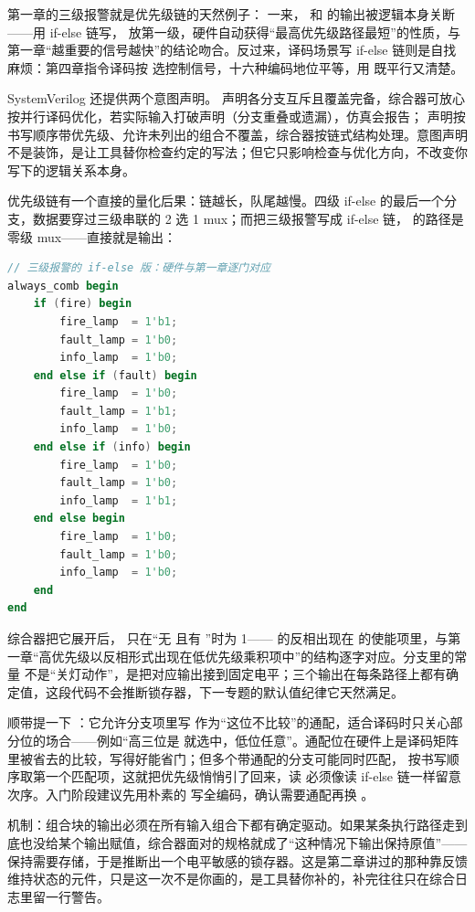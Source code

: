 第一章的三级报警就是优先级链的天然例子： 一来， 和  的输出被逻辑本身关断——用 if-else 链写， 放第一级，硬件自动获得“最高优先级路径最短”的性质，与第一章“越重要的信号越快”的结论吻合。反过来，译码场景写 if-else 链则是自找麻烦：第四章指令译码按  选控制信号，十六种编码地位平等，用  既平行又清楚。

SystemVerilog 还提供两个意图声明。 声明各分支互斥且覆盖完备，综合器可放心按并行译码优化，若实际输入打破声明（分支重叠或遗漏），仿真会报告； 声明按书写顺序带优先级、允许未列出的组合不覆盖，综合器按链式结构处理。意图声明不是装饰，是让工具替你检查约定的写法；但它只影响检查与优化方向，不改变你写下的逻辑关系本身。

优先级链有一个直接的量化后果：链越长，队尾越慢。四级 if-else 的最后一个分支，数据要穿过三级串联的 2 选 1 mux；而把三级报警写成 if-else 链， 的路径是零级 mux——直接就是输出：

\begin{lstlisting}[language=Verilog]
// 三级报警的 if-else 版：硬件与第一章逐门对应
always_comb begin
    if (fire) begin
        fire_lamp  = 1'b1;
        fault_lamp = 1'b0;
        info_lamp  = 1'b0;
    end else if (fault) begin
        fire_lamp  = 1'b0;
        fault_lamp = 1'b1;
        info_lamp  = 1'b0;
    end else if (info) begin
        fire_lamp  = 1'b0;
        fault_lamp = 1'b0;
        info_lamp  = 1'b1;
    end else begin
        fire_lamp  = 1'b0;
        fault_lamp = 1'b0;
        info_lamp  = 1'b0;
    end
end
\end{lstlisting}

综合器把它展开后， 只在“无  且有 ”时为 1—— 的反相出现在  的使能项里，与第一章“高优先级以反相形式出现在低优先级乘积项中”的结构逐字对应。分支里的常量  不是“关灯动作”，是把对应输出接到固定电平；三个输出在每条路径上都有确定值，这段代码不会推断锁存器，下一专题的默认值纪律它天然满足。

顺带提一下 ：它允许分支项里写  作为“这位不比较”的通配，适合译码时只关心部分位的场合——例如“高三位是  就选中，低位任意”。通配位在硬件上是译码矩阵里被省去的比较，写得好能省门；但多个带通配的分支可能同时匹配， 按书写顺序取第一个匹配项，这就把优先级悄悄引了回来，读  必须像读 if-else 链一样留意次序。入门阶段建议先用朴素的  写全编码，确认需要通配再换 。

机制：组合块的输出必须在所有输入组合下都有确定驱动。如果某条执行路径走到底也没给某个输出赋值，综合器面对的规格就成了“这种情况下输出保持原值”——保持需要存储，于是推断出一个电平敏感的锁存器。这是第二章讲过的那种靠反馈维持状态的元件，只是这一次不是你画的，是工具替你补的，补完往往只在综合日志里留一行警告。

